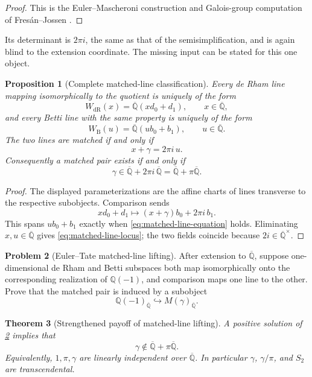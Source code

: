 \documentclass[11pt]{article}
\newtheorem{theorem}{Theorem}[section]
\newtheorem{proposition}[theorem]{Proposition}
\theoremstyle{definition}
\newtheorem{problem}[theorem]{Problem}
\theoremstyle{remark}
\newcommand{\Q}{\mathbb Q}
\newcommand{\Qbar}{\overline{\mathbb Q}}
\begin{document}
\begin{proof}
This is the Euler--Mascheroni construction and Galois-group computation of
Fres\'an--Jossen \cite[\S12.8]{FresanJossen2024}.
\end{proof}

Its determinant is \(2\pi i\), the same as that of the semisimplification,
and is again blind to the extension coordinate.  The missing input can be
stated for this one object.

\begin{proposition}[Complete matched-line classification]
\label{prop:matched-line-classification}
Every de Rham line mapping isomorphically to the quotient is uniquely of
the form
\[
 W_{\mathrm{dR}}(x)=\Qbar(xd_0+d_1),\qquad x\in\Qbar,
\]
and every Betti line with the same property is uniquely of the form
\[
 W_{\mathrm B}(u)=\Qbar(ub_0+b_1),\qquad u\in\Qbar.
\]
The two lines are matched if and only if
\begin{equation}\label{eq:matched-line-equation}
 \boxed{x+\gamma=2\pi i\,u.}
\end{equation}
Consequently a matched pair exists if and only if
\begin{equation}\label{eq:matched-line-locus}
 \boxed{\gamma\in\Qbar+2\pi i\,\Qbar
              =\Qbar+\pi\Qbar.}
\end{equation}
\end{proposition}

\begin{proof}
The displayed parameterizations are the affine charts of lines transverse
to the respective subobjects.  Comparison sends
\[
 xd_0+d_1\longmapsto(x+\gamma)b_0+2\pi i\,b_1.
\]
This spans \(ub_0+b_1\) exactly when
\eqref{eq:matched-line-equation} holds.  Eliminating \(x,u\in\Qbar\)
gives \eqref{eq:matched-line-locus}; the two fields coincide because
\(2i\in\Qbar^\times\).
\end{proof}

\begin{problem}[Euler--Tate matched-line lifting]
\label{prob:euler-tate-fullness}
After extension to \(\Qbar\), suppose one-dimensional de Rham and Betti
subspaces both map isomorphically onto the corresponding realization of
\(\Q(-1)\), and comparison maps one line to the other.  Prove that the
matched pair is induced by a subobject
\[
 \Q(-1)_{\Qbar}\hookrightarrow M(\gamma)_{\Qbar}.
\]
\end{problem}

\begin{theorem}[Strengthened payoff of matched-line lifting]
\label{thm:matched-line-implies-gamma}
A positive solution of \cref{prob:euler-tate-fullness} implies that
\begin{equation}\label{eq:matched-line-payoff}
 \boxed{\gamma\notin\Qbar+\pi\Qbar.}
\end{equation}
Equivalently, \(1,\pi,\gamma\) are linearly independent over \(\Qbar\).
In particular \(\gamma\), \(\gamma/\pi\), and \(S_2\) are transcendental.
\end{theorem}
\end{document}
